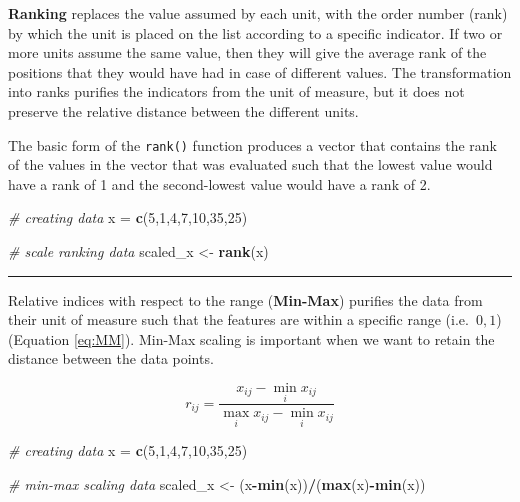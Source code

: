 \documentclass[
]{svmono}
\newenvironment{Shaded}{\begin{snugshade}}{\end{snugshade}}
\newcommand{\CommentTok}[1]{\textcolor[rgb]{0.56,0.35,0.01}{\textit{#1}}}
\newcommand{\DecValTok}[1]{\textcolor[rgb]{0.00,0.00,0.81}{#1}}
\newcommand{\FunctionTok}[1]{\textcolor[rgb]{0.13,0.29,0.53}{\textbf{#1}}}
\newcommand{\NormalTok}[1]{#1}
\newcommand{\OtherTok}[1]{\textcolor[rgb]{0.56,0.35,0.01}{#1}}
\newcommand{\SpecialCharTok}[1]{\textcolor[rgb]{0.81,0.36,0.00}{\textbf{#1}}}
\begin{document}
\textbf{Ranking} replaces the value assumed by each unit, with the order
number (rank) by which the unit is placed on the list according to a
specific indicator. If two or more units assume the same value, then
they will give the average rank of the positions that they would have
had in case of different values. The transformation into ranks purifies
the indicators from the unit of measure, but it does not preserve the
relative distance between the different units.

The basic form of the \texttt{rank()} function produces a vector that contains
the rank of the values in the vector that was evaluated such that the
lowest value would have a rank of 1 and the second-lowest value would
have a rank of 2.

\begin{Shaded}
\begin{Highlighting}[]
\CommentTok{\# creating data}
\NormalTok{x }\OtherTok{=} \FunctionTok{c}\NormalTok{(}\DecValTok{5}\NormalTok{,}\DecValTok{1}\NormalTok{,}\DecValTok{4}\NormalTok{,}\DecValTok{7}\NormalTok{,}\DecValTok{10}\NormalTok{,}\DecValTok{35}\NormalTok{,}\DecValTok{25}\NormalTok{)}

\CommentTok{\# scale ranking data}
\NormalTok{scaled\_x }\OtherTok{\textless{}{-}} \FunctionTok{rank}\NormalTok{(x)}
\end{Highlighting}
\end{Shaded}

\begin{center}\rule{0.5\linewidth}{0.5pt}\end{center}

Relative indices with respect to the range (\textbf{Min-Max}) purifies the
data from their unit of measure such that the features are within a
specific range (i.e.~\(0, 1\))(Equation \eqref{eq:MM}). Min-Max scaling is important when we want
to retain the distance between the data points.

\begin{equation}
r_{ij}=\frac{x_{ij}-\min_ix_{ij}}{\max_ix_{ij}-\min_ix_{ij}}
\label{eq:MM}
\end{equation}

\begin{Shaded}
\begin{Highlighting}[]
\CommentTok{\# creating data}
\NormalTok{x }\OtherTok{=} \FunctionTok{c}\NormalTok{(}\DecValTok{5}\NormalTok{,}\DecValTok{1}\NormalTok{,}\DecValTok{4}\NormalTok{,}\DecValTok{7}\NormalTok{,}\DecValTok{10}\NormalTok{,}\DecValTok{35}\NormalTok{,}\DecValTok{25}\NormalTok{)}

\CommentTok{\# min{-}max scaling data}
\NormalTok{scaled\_x }\OtherTok{\textless{}{-}}\NormalTok{ (x}\SpecialCharTok{{-}}\FunctionTok{min}\NormalTok{(x))}\SpecialCharTok{/}\NormalTok{(}\FunctionTok{max}\NormalTok{(x)}\SpecialCharTok{{-}}\FunctionTok{min}\NormalTok{(x))}
\end{Highlighting}
\end{Shaded}
\end{document}
